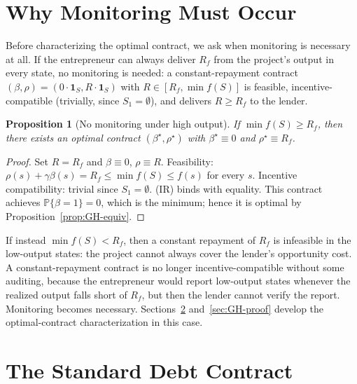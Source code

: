 \documentclass[11pt,a4paper,oneside]{book}
\def\1{\mathbf{1}}
\def\leq{\leqslant}
\def\geq{\geqslant}
\renewcommand{\P}{\mathbb{P}}
\theoremstyle{plain}
\newtheorem{proposition}[theorem]{Proposition}
\theoremstyle{definition}
\theoremstyle{remark}
\numberwithin{equation}{chapter}
\begin{document}
\section{Why Monitoring Must Occur}
\label{sec:GH-why-monitor}

Before characterizing the optimal contract, we ask when monitoring is necessary at all.
If the entrepreneur can always deliver $R_f$ from the project's output in every state, no monitoring is needed: a constant-repayment contract $(\beta, \rho) = (0 \cdot \1_S, R \cdot \1_S)$ with $R \in [R_f, \min f(S)]$ is feasible, incentive-compatible (trivially, since $S_1 = \emptyset$), and delivers $R \geq R_f$ to the lender.

\begin{proposition}[No monitoring under high output]\label{prop:no-monitor}
If $\min f(S) \geq R_f$, then there exists an optimal contract $(\beta^\star, \rho^\star)$ with $\beta^\star \equiv 0$ and $\rho^\star \equiv R_f$.
\end{proposition}

\begin{proof}
Set $R = R_f$ and $\beta \equiv 0$, $\rho \equiv R$.
Feasibility: $\rho(s) + \gamma \beta(s) = R_f \leq \min f(S) \leq f(s)$ for every $s$.
Incentive compatibility: trivial since $S_1 = \emptyset$.
(IR) binds with equality.
This contract achieves $\P\{\beta = 1\} = 0$, which is the minimum; hence it is optimal by Proposition~\ref{prop:GH-equiv}.
\end{proof}

If instead $\min f(S) < R_f$, then a constant repayment of $R_f$ is infeasible in the low-output states: the project cannot always cover the lender's opportunity cost.
A constant-repayment contract is no longer incentive-compatible without some auditing, because the entrepreneur would report low-output states whenever the realized output falls short of $R_f$, but then the lender cannot verify the report.
Monitoring becomes necessary.
Sections~\ref{sec:GH-characterization} and~\ref{sec:GH-proof} develop the optimal-contract characterization in this case.

\section{The Standard Debt Contract}
\label{sec:GH-characterization}
\end{document}
